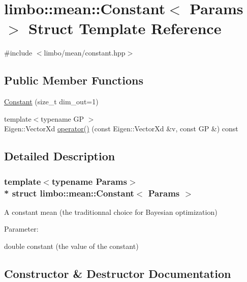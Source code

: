 \hypertarget{structlimbo_1_1mean_1_1_constant}{}\section{limbo\+:\+:mean\+:\+:Constant$<$ Params $>$ Struct Template Reference}
\label{structlimbo_1_1mean_1_1_constant}


{\ttfamily \#include $<$limbo/mean/constant.\+hpp$>$}

\subsection*{Public Member Functions}
\begin{DoxyCompactItemize}
\item 
\hyperlink{structlimbo_1_1mean_1_1_constant_a263296f6d6b10aa360727137588735f7}{Constant} (size\+\_\+t dim\+\_\+out=1)
\item 
{\footnotesize template$<$typename GP $>$ }\\Eigen\+::\+Vector\+Xd \hyperlink{structlimbo_1_1mean_1_1_constant_a6ea7d6a07dfb9a45cefe9717dd25030b}{operator()} (const Eigen\+::\+Vector\+Xd \&v, const GP \&) const 
\end{DoxyCompactItemize}


\subsection{Detailed Description}
\subsubsection*{template$<$typename Params$>$\\*
struct limbo\+::mean\+::\+Constant$<$ Params $>$}

A constant mean (the traditionnal choice for Bayesian optimization)

Parameter\+:
\begin{DoxyItemize}
\item {\ttfamily double constant} (the value of the constant) 
\end{DoxyItemize}

\subsection{Constructor \& Destructor Documentation}
